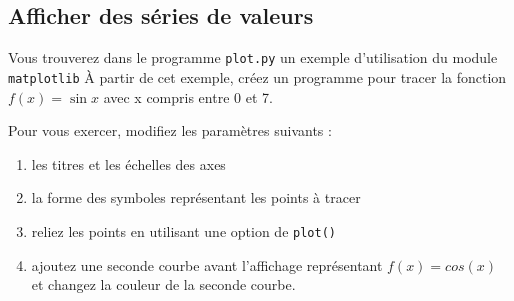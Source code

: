 \subsection{Afficher des séries de valeurs}

Vous trouverez dans le programme \texttt{plot.py} un exemple d'utilisation du module \texttt{matplotlib}
À partir de cet exemple, créez un programme pour tracer la fonction $f(x)=\sin x$ avec x compris entre 0 et 7.

Pour vous exercer, modifiez les paramètres suivants :

\begin{enumerate}
\item les titres et les échelles des axes

\item la forme des  symboles représentant les points à tracer

\item reliez les points en utilisant une option de \texttt{plot()}

\item ajoutez une seconde courbe avant l'affichage représentant $f(x)=cos(x)$ et changez la couleur
  de la seconde courbe.


\end{enumerate}


\vfill
